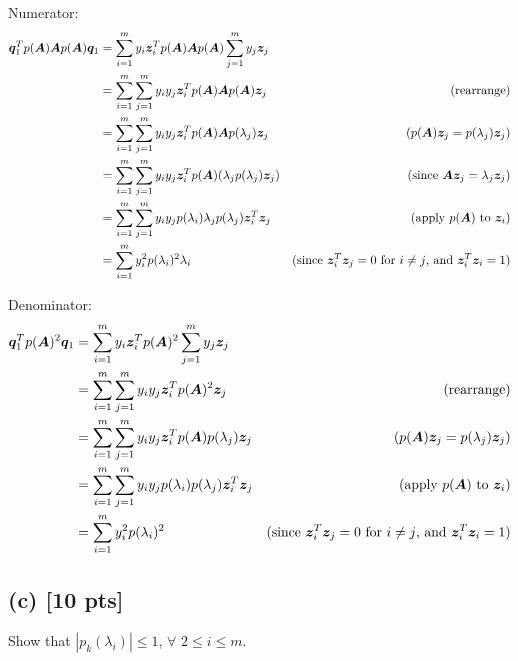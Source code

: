 \documentclass[twoside,10pt]{article}
\begin{document}
Numerator:
\begin{align*}
  \bm{q}_1^T p(\bm{A}) \bm{A} p(\bm{A}) \bm{q}_1 &= \sum_{i=1}^m y_i \bm{z}_i^T p(\bm{A}) \bm{A} p(\bm{A}) \sum_{j=1}^m y_j \bm{z}_j & \\
  &= \sum_{i=1}^m \sum_{j=1}^m y_i y_j \bm{z}_i^T p(\bm{A}) \bm{A} p(\bm{A}) \bm{z}_j &\text{(rearrange)}\\
  &= \sum_{i=1}^m \sum_{j=1}^m y_i y_j \bm{z}_i^T p(\bm{A}) \bm{A}  p(\lambda_j) \bm{z}_j &\text{($p(\bm{A})\bm{z}_j = p(\lambda_j) \bm{z}_j$)}\\
  &= \sum_{i=1}^m \sum_{j=1}^m y_i y_j \bm{z}_i^T p(\bm{A}) (\lambda_j p(\lambda_j) \bm{z}_j) &\text{(since $\bm{A}\bm{z}_j = \lambda_j \bm{z}_j$)} \\
  &= \sum_{i=1}^m \sum_{j=1}^m y_i y_j p(\lambda_i) \lambda_j p(\lambda_j) \bm{z}_i^T \bm{z}_j &\text{(apply $p(\bm{A})$ to $\bm{z}_i$)} \\
  &= \sum_{i=1}^m y_i^2 p(\lambda_i)^2 \lambda_i &\text{(since $\bm{z}_i^T \bm{z}_j=0$ for $i\neq j$, and $\bm{z}_i^T \bm{z}_i=1$)}
\end{align*}

Denominator:
\begin{align*}
  \bm{q}_1^T p(\bm{A})^2 \bm{q}_1 &= \sum_{i=1}^m y_i \bm{z}_i^T p(\bm{A})^2 \sum_{j=1}^m y_j \bm{z}_j \\
  &= \sum_{i=1}^m \sum_{j=1}^m y_i y_j \bm{z}_i^T p(\bm{A})^2 \bm{z}_j &\text{(rearrange)}\\
  &= \sum_{i=1}^m \sum_{j=1}^m y_i y_j \bm{z}_i^T p(\bm{A})  p(\lambda_j) \bm{z}_j &\text{($p(\bm{A})\bm{z}_j = p(\lambda_j) \bm{z}_j$)}\\
  &= \sum_{i=1}^m \sum_{j=1}^m y_i y_j p(\lambda_i) p(\lambda_j) \bm{z}_i^T \bm{z}_j &\text{(apply $p(\bm{A})$ to $\bm{z}_i$)} \\
  &= \sum_{i=1}^m y_i^2 p(\lambda_i)^2 &\text{(since $\bm{z}_i^T \bm{z}_j=0$ for $i\neq j$, and $\bm{z}_i^T \bm{z}_i=1$)}
\end{align*}

\subsection*{(c) [10 pts]}
Show that $|p_k(\lambda_i)| \leq 1$, $\forall$ $2 \leq i \leq m$. 
\end{document}
